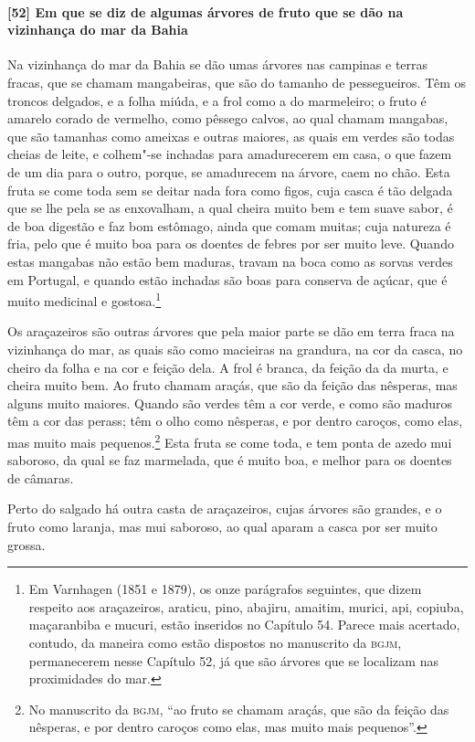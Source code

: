 \begin{linenumbers}
\paragraph{[52] Em que se diz de algumas árvores de fruto que se dão na vizinhança do mar da
Bahia}\quad
Na vizinhança do mar da Bahia se dão umas árvores nas campinas e terras fracas, que se
chamam mangabeiras, que são do tamanho de pessegueiros. Têm os troncos delgados, e a folha
miúda, e a frol como a do marmeleiro; o fruto é amarelo corado de vermelho, como pêssego
calvos, ao qual chamam mangabas, que são tamanhas como ameixas e outras maiores, as quais
em verdes são todas cheias de leite, e colhem"-se inchadas para amadurecerem em casa, o que
fazem de um dia para o outro, porque, se amadurecem na árvore, caem no chão. Esta fruta se
come toda sem se deitar nada fora como figos, cuja casca é tão delgada que se lhe pela se
as enxovalham, a qual cheira muito bem e tem suave sabor, é de boa digestão e faz bom
estômago, ainda que comam muitas; cuja natureza é fria, pelo que é muito boa para os
doentes de febres por ser muito leve. Quando estas mangabas não estão bem maduras, travam
na boca como as sorvas verdes em Portugal, e quando estão inchadas são boas para conserva
de açúcar, que é muito medicinal e gostosa.\footnote{ Em Varnhagen (1851 e 1879), os onze
parágrafos seguintes, que dizem respeito aos araçazeiros, araticu, pino, abajiru, amaitim,
murici, api, copiuba, maçaranbiba e mucuri, estão inseridos no Capítulo 54. Parece mais
acertado, contudo, da maneira como estão dispostos no manuscrito da \textsc{bgjm},
permanecerem nesse Capítulo 52, já que são árvores que se localizam nas proximidades do
mar.}

Os araçazeiros são outras árvores que pela maior parte se dão em terra fraca na vizinhança
do mar, as quais são como macieiras na grandura, na cor da casca, no cheiro da folha e na
cor e feição dela. A frol é branca, da feição da da murta, e cheira muito bem. Ao fruto
chamam araçás, que são da feição das nêsperas, mas alguns muito maiores. Quando são verdes
têm a cor verde, e como são maduros têm a cor das perass; têm o olho como nêsperas, e por
dentro caroços, como elas, mas muito mais pequenos.\footnote{ No manuscrito da
\textsc{bgjm}, ``ao fruto se chamam araçás, que são da feição das nêsperas, e por dentro
caroços como elas, mas muito mais pequenos''.} Esta fruta se come toda, e tem ponta de
azedo mui saboroso, da qual se faz marmelada, que é muito boa, e melhor para os doentes de
câmaras.


Perto do salgado há outra casta de araçazeiros, cujas árvores são grandes, e o fruto como
laranja, mas mui saboroso, ao qual aparam a casca por ser muito grossa.


\end{linenumbers}
